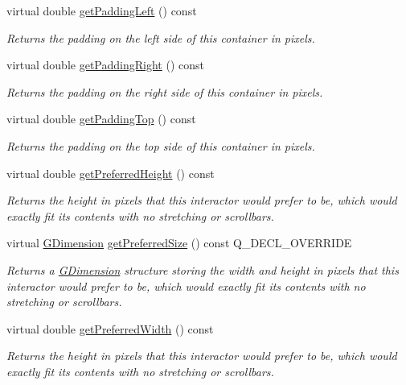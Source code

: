 \begin{DoxyCompactItemize}
virtual double \mbox{\hyperlink{classGContainer_af28748a6467a4d3337788578522fa8f4}{get\+Padding\+Left}} () const
\begin{DoxyCompactList}\small\item\em Returns the padding on the left side of this container in pixels. \end{DoxyCompactList}\item 
virtual double \mbox{\hyperlink{classGContainer_a8d75cea586f7cd6611432122a080ecce}{get\+Padding\+Right}} () const
\begin{DoxyCompactList}\small\item\em Returns the padding on the right side of this container in pixels. \end{DoxyCompactList}\item 
virtual double \mbox{\hyperlink{classGContainer_ada97c35b2f3366886a49d63fff9d7bd4}{get\+Padding\+Top}} () const
\begin{DoxyCompactList}\small\item\em Returns the padding on the top side of this container in pixels. \end{DoxyCompactList}\item 
virtual double \mbox{\hyperlink{classGInteractor_a747de0961653847bdc6615dbf756d715}{get\+Preferred\+Height}} () const
\begin{DoxyCompactList}\small\item\em Returns the height in pixels that this interactor would prefer to be, which would exactly fit its contents with no stretching or scrollbars. \end{DoxyCompactList}\item 
virtual \mbox{\hyperlink{classGDimension}{G\+Dimension}} \mbox{\hyperlink{classGContainer_a21904b305edacd8f871d6951cb8d3fa5}{get\+Preferred\+Size}} () const Q\+\_\+\+D\+E\+C\+L\+\_\+\+O\+V\+E\+R\+R\+I\+DE
\begin{DoxyCompactList}\small\item\em Returns a \mbox{\hyperlink{classGDimension}{G\+Dimension}} structure storing the width and height in pixels that this interactor would prefer to be, which would exactly fit its contents with no stretching or scrollbars. \end{DoxyCompactList}\item 
virtual double \mbox{\hyperlink{classGInteractor_a82bca31d37700fb0e35d2743352efd5e}{get\+Preferred\+Width}} () const
\begin{DoxyCompactList}\small\item\em Returns the height in pixels that this interactor would prefer to be, which would exactly fit its contents with no stretching or scrollbars. \end{DoxyCompactList}\item 

\end{DoxyCompactItemize}
